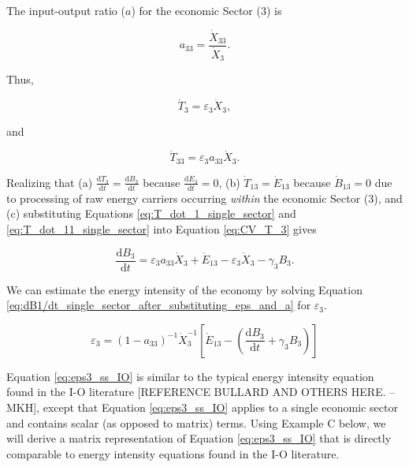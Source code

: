 The input-output ratio ($a$) for the economic Sector (3) is

\begin{equation} \label{eq:io_ratio_single_sector}
	a_{33} = \frac{\dot{X}_{33}}{\dot{X}_{3}}.
\end{equation}

\noindent Thus,

\begin{equation} \label{eq:T_dot_1_single_sector}
	\dot{T}_{3} = \varepsilon_{3}\dot{X}_{3},
\end{equation}

\noindent and

\begin{equation} \label{eq:T_dot_11_single_sector}
	\dot{T}_{33} = \varepsilon_{3}a_{33}\dot{X}_{3}.
\end{equation}

Realizing that (a) $\frac{\mathrm{d}T_3}{\mathrm{d}t} = \frac{\mathrm{d}B_3}{\mathrm{d}t}$ because $\frac{\mathrm{d}E_3}{\mathrm{d}t} = 0$, (b) $\dot{T}_{13} = \dot{E}_{13}$ because $\dot{B}_{13} = 0$ due to processing of raw energy carriers occurring \emph{within} the economic Sector (3), and (c) substituting Equations \ref{eq:T_dot_1_single_sector} and \ref{eq:T_dot_11_single_sector} into Equation \ref{eq:CV_T_3} gives

\begin{equation} \label{eq:dB1/dt_single_sector_after_substituting_eps_and_a}
	\frac{\mathrm{d}B_{3}}{\mathrm{d}t} = \varepsilon_{3}a_{33}\dot{X}_{3} + \dot{E}_{13} - \varepsilon_{3}\dot{X}_{3} - \gamma_{3}B_{3}.
\end{equation}

We can estimate the energy intensity of the economy by solving Equation \ref{eq:dB1/dt_single_sector_after_substituting_eps_and_a} for $\varepsilon_{3}$.

\begin{equation} \label{eq:eps3_ss_IO}
	\varepsilon_{3} = (1 - a_{33})^{-1} \dot{X}_{3}^{-1} \left[\dot{E}_{13} - \left(\frac{\mathrm{d}B_{3}}{\mathrm{d}t} + \gamma_{3}B_{3}\right)\right]
\end{equation}

Equation \ref{eq:eps3_ss_IO} is similar to the typical energy intensity equation found in the I-O literature [REFERENCE BULLARD AND OTHERS HERE. --MKH], except that Equation \ref{eq:eps3_ss_IO} applies to a single economic sector and contains scalar (as opposed to matrix) terms. Using Example C below, we will derive a matrix representation of Equation \ref{eq:eps3_ss_IO} that is directly comparable to energy intensity equations found in the I-O literature.

